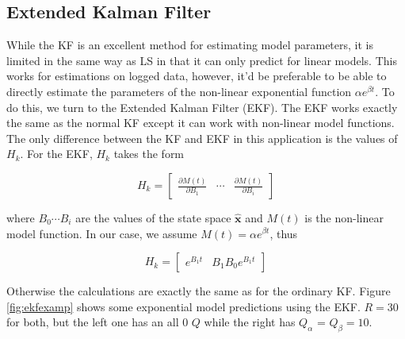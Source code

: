 \subsection{Extended Kalman Filter}

While the KF is an excellent method for estimating model parameters, it is limited in the same way as LS in that it can only predict for linear models. This works for estimations on logged data, however, it'd be preferable to be able to directly estimate the parameters of the non-linear exponential function $\alpha e^{\beta t}$. To do this, we turn to the Extended Kalman Filter (EKF). The EKF works exactly the same as the normal KF except it can work with non-linear model functions. The only difference between the KF and EKF in this application is the values of $H_{k}$. For the EKF, $H_{k}$ takes the form

\begin{equation}
H_{k} = \begin{bmatrix}
           \frac{\partial M(t)}{\partial B_{1}} & \cdots & \frac{\partial M(t)}{\partial B_{i}}
         \end{bmatrix}
\end{equation}

where $B_{0} \cdots B_{i}$ are the values of the state space $\bm{\hat{x}}$ and $M(t)$ is the non-linear model function. In our case, we assume $M(t) = \alpha e^{\beta t}$, thus

\begin{equation}
H_{k} = \begin{bmatrix}
           e^{B_{1}t}&B_{1}B_{0}e^{B_{1}t}
         \end{bmatrix}
\end{equation}

Otherwise the calculations are exactly the same as for the ordinary KF. Figure \ref{fig:ekfexamp} shows some exponential model predictions using the EKF. $R = 30$ for both, but the left one has an all 0 $Q$ while the right has $Q_{\alpha}$ = $Q_{\beta} = 10$.


